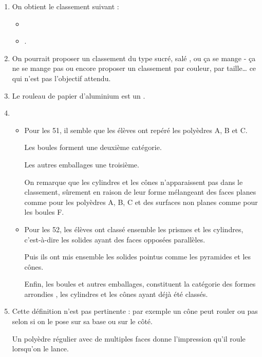 \begin{Maquette}[Fiche,CorrigeFin,Colonnes=2]{}
\begin{multicols}{2}
      \begin{Solution}
         \begin{enumerate}
            \item On obtient le classement suivant :
            \begin{itemize}
               \item {}
               \item {}. 
            \end{itemize}
            \item On pourrait proposer un classement du type \og sucré, salé \fg{}, ou \og ça se mange - ça ne se mange pas \fg{} ou encore proposer un classement par couleur, par taille\dots{} ce qui n'est pas l'objectif attendu.
            \item Le rouleau de papier d'aluminium est un . 
            \item 
               \begin{itemize}
                  \item Pour les 51, il semble que les élèves ont \og repéré \fg{} les polyèdres A, B et C. \par
                     Les boules forment une deuxième catégorie. \par
                     Les autres emballages une troisième. \par
                     On remarque que les cylindres et les cônes n'apparaissent pas dans le classement, sûrement en raison de leur forme mélangeant des faces planes comme pour les polyèdres A, B, C et des surfaces non planes comme pour les boules F.
                  \item Pour les 52, les élèves ont classé ensemble les prismes et les cylindres, c'est-à-dire les solides ayant des faces opposées parallèles. \par
                     Puis ils ont mis ensemble les solides \og pointus \fg{} comme les pyramides et les cônes. \par
                     Enfin, les boules et autres emballages, constituent la catégorie des formes \og arrondies \fg{}, les cylindres et les cônes ayant déjà été classés. 
               \end{itemize}
            \item Cette définition n'est pas pertinente : par exemple un cône peut rouler ou pas selon si on le pose sur sa base ou sur le côté. \par
            Un polyèdre régulier avec de multiples faces donne l'impression qu'il roule lorsqu'on le lance.
         \end{enumerate}
      \end{Solution}
      

\end{multicols}
\end{Maquette}
